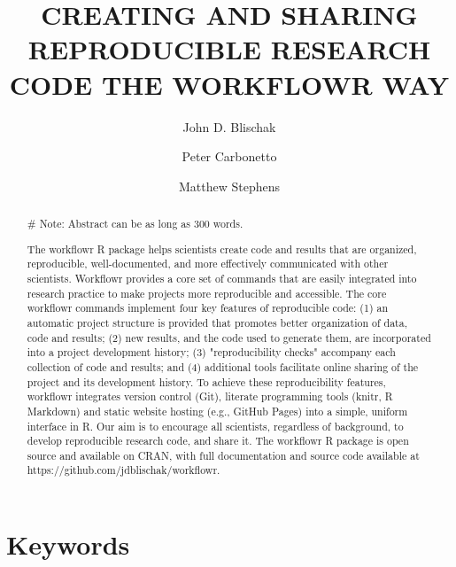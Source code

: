 \documentclass[9pt,a4paper]{extarticle}
\begin{document}
\pagestyle{front}

\title{CREATING AND SHARING REPRODUCIBLE RESEARCH CODE THE WORKFLOWR
WAY}

\author[1]{John D. Blischak}

\author[1,2]{Peter Carbonetto}

\author[1,3]{Matthew Stephens}




\maketitle

\thispagestyle{front}

\begin{abstract}

\# Note: Abstract can be as long as 300 words.

The workflowr R package helps scientists create code and results that
are organized, reproducible, well-documented, and more effectively
communicated with other scientists. Workflowr provides a core set of
commands that are easily integrated into research practice to make
projects more reproducible and accessible. The core workflowr commands
implement four key features of reproducible code: (1) an automatic
project structure is provided that promotes better organization of data,
code and results; (2) new results, and the code used to generate them,
are incorporated into a project development history; (3)
"reproducibility checks" accompany each collection of code and results;
and (4) additional tools facilitate online sharing of the project and
its development history. To achieve these reproducibility features,
workflowr integrates version control (Git), literate programming tools
(knitr, R Markdown) and static website hosting (e.g., GitHub Pages) into
a simple, uniform interface in R. Our aim is to encourage all
scientists, regardless of background, to develop reproducible research
code, and share it. The workflowr R package is open source and available
on CRAN, with full documentation and source code available at
https://github.com/jdblischak/workflowr.

\end{abstract}

\section*{Keywords}
\end{document}
